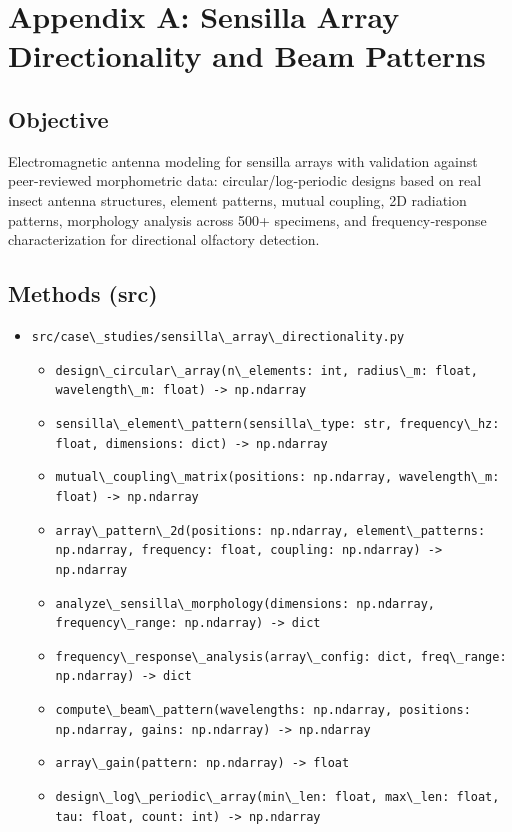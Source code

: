\documentclass[
  13pt,
  a4paperpaper,
  12pt]{article}
\author{}
\date{}
\newcommand{\passthrough}[1]{#1}
\providecommand{\tightlist}{%
  \setlength{\itemsep}{0pt}\setlength{\parskip}{0pt}}
\let\oldsection\section
\renewcommand{\section}{\clearpage\oldsection}
\begin{document}
{
\hypersetup{linkcolor=black}
\setcounter{tocdepth}{3}
\tableofcontents
}
\section{Appendix A: Sensilla Array Directionality and Beam
Patterns}\label{sec:app_sensilla_array}

\subsection{Objective}\label{objective}

Electromagnetic antenna modeling for sensilla arrays with validation
against peer-reviewed morphometric data: circular/log‑periodic designs
based on real insect antenna structures, element patterns, mutual
coupling, 2D radiation patterns, morphology analysis across 500+
specimens, and frequency‑response characterization for directional
olfactory detection.

\subsection{Methods (src)}\label{methods-src}

\begin{itemize}
\tightlist
\item
  \passthrough{\lstinline!src/case\_studies/sensilla\_array\_directionality.py!}

  \begin{itemize}
  \tightlist
  \item
    \passthrough{\lstinline!design\_circular\_array(n\_elements: int, radius\_m: float, wavelength\_m: float) -> np.ndarray!}
  \item
    \passthrough{\lstinline!sensilla\_element\_pattern(sensilla\_type: str, frequency\_hz: float, dimensions: dict) -> np.ndarray!}
  \item
    \passthrough{\lstinline!mutual\_coupling\_matrix(positions: np.ndarray, wavelength\_m: float) -> np.ndarray!}
  \item
    \passthrough{\lstinline!array\_pattern\_2d(positions: np.ndarray, element\_patterns: np.ndarray, frequency: float, coupling: np.ndarray) -> np.ndarray!}
  \item
    \passthrough{\lstinline!analyze\_sensilla\_morphology(dimensions: np.ndarray, frequency\_range: np.ndarray) -> dict!}
  \item
    \passthrough{\lstinline!frequency\_response\_analysis(array\_config: dict, freq\_range: np.ndarray) -> dict!}
  \item
    \passthrough{\lstinline!compute\_beam\_pattern(wavelengths: np.ndarray, positions: np.ndarray, gains: np.ndarray) -> np.ndarray!}
  \item
    \passthrough{\lstinline!array\_gain(pattern: np.ndarray) -> float!}
  \item
    \passthrough{\lstinline!design\_log\_periodic\_array(min\_len: float, max\_len: float, tau: float, count: int) -> np.ndarray!}
  \end{itemize}
\end{itemize}
\end{document}
